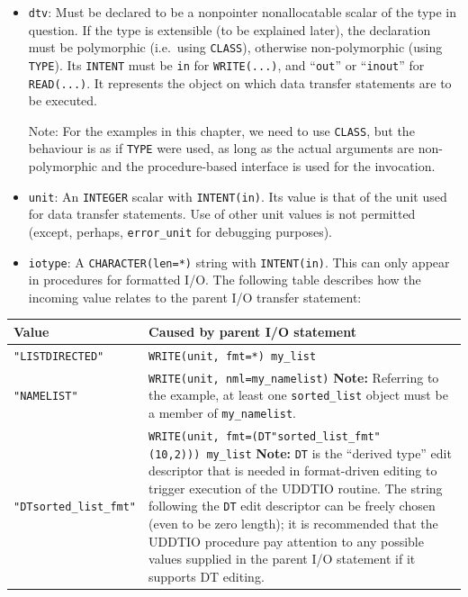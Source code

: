 \documentclass[
]{article}
\begin{document}
\begin{itemize}
\item
  \texttt{dtv}: Must be declared to be a nonpointer nonallocatable
  scalar of the type in question. If the type is extensible (to be
  explained later), the declaration must be polymorphic (i.e.~using
  \texttt{CLASS}), otherwise non-polymorphic (using \texttt{TYPE}). Its
  \texttt{INTENT} must be \texttt{in} for \texttt{WRITE(...)}, and
  ``\texttt{out}'' or ``\texttt{inout}'' for \texttt{READ(...)}. It
  represents the object on which data transfer statements are to be
  executed.

  Note: For the examples in this chapter, we need to use \texttt{CLASS},
  but the behaviour is as if \texttt{TYPE} were used, as long as the
  actual arguments are non-polymorphic and the procedure-based interface
  is used for the invocation.
\item
  \texttt{unit}: An \texttt{INTEGER} scalar with \texttt{INTENT(in)}.
  Its value is that of the unit used for data transfer statements. Use
  of other unit values is not permitted (except, perhaps,
  \texttt{error\_unit} for debugging purposes).
\item
  \texttt{iotype}: A \texttt{CHARACTER(len=*)} string with
  \texttt{INTENT(in)}. This can only appear in procedures for formatted
  I/O. The following table describes how the incoming value relates to
  the parent I/O transfer statement:
\end{itemize}

\begin{longtable}[]{@{}
  >{\raggedright\arraybackslash}p{}
  >{\raggedright\arraybackslash}p{}@{}}
\toprule\noalign{}
\begin{minipage}[b]{\linewidth}\raggedright
Value
\end{minipage} & \begin{minipage}[b]{\linewidth}\raggedright
Caused by parent I/O statement
\end{minipage} \\
\midrule\noalign{}
\endhead
\bottomrule\noalign{}
\endlastfoot
\texttt{"LISTDIRECTED"} & \texttt{WRITE(unit,\ fmt=*)\ my\_list} \\
\texttt{"NAMELIST"} & \texttt{WRITE(unit,\ nml=my\_namelist)}
\textbf{Note:} Referring to the example, at least one
\texttt{sorted\_list} object must be a member of
\texttt{my\_namelist}. \\
\texttt{"DTsorted\_list\_fmt"} &
\texttt{WRITE(unit,\ fmt=\textquotesingle{}(DT"sorted\_list\_fmt"(10,2))\textquotesingle{})\ my\_list}
\textbf{Note:} \texttt{DT} is the ``derived type'' edit descriptor that
is needed in format-driven editing to trigger execution of the UDDTIO
routine. The string following the \texttt{DT} edit descriptor can be
freely chosen (even to be zero length); it is recommended that the
UDDTIO procedure pay attention to any possible values supplied in the
parent I/O statement if it supports DT editing. \\
\end{longtable}
\end{document}

